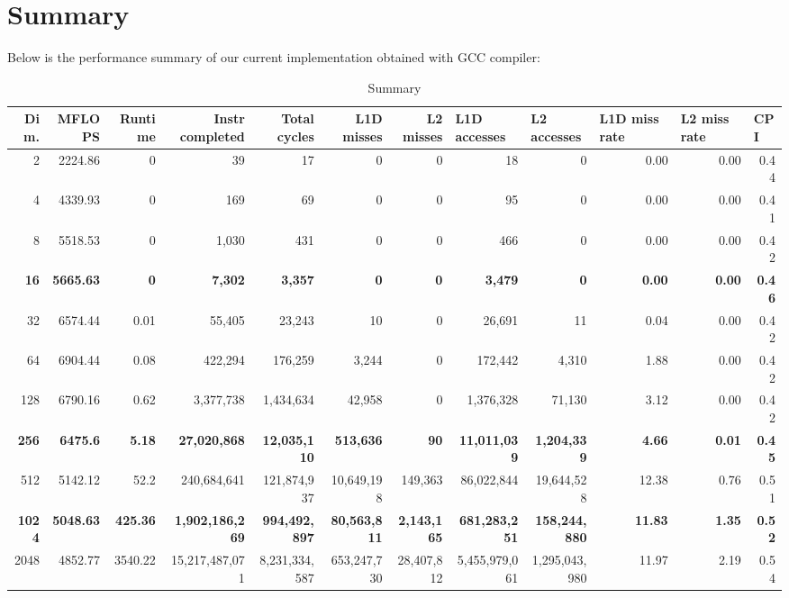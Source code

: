 \documentclass{article}
\begin{document}
\section{Summary}
Below is the performance summary of our current implementation obtained with GCC compiler:
\begin{table}[htbp]
\tiny
\caption{Summary}
\begin{tabular}{|r|r|r|r|r|r|r|r|r|r|r|r|}
\hline
Dim. &   MFLOPS &     Runtime & Instr completed & Total cycles & L1D misses & L2 misses & \multicolumn{1}{l|}{L1D accesses} & \multicolumn{1}{l|}{ L2 accesses} & \multicolumn{1}{l|}{L1D miss rate} & \multicolumn{1}{l|}{L2 miss rate} & \multicolumn{1}{l|}{CPI} \\ \hline
2 & 2224.86 & 0 & 39 & 17 & 0 & 0 & 18 & 0 & 0.00 & 0.00 & 0.44 \\ \hline
4 & 4339.93 & 0 & 169 & 69 & 0 & 0 & 95 & 0 & 0.00 & 0.00 & 0.41 \\ \hline
8 & 5518.53 & 0 & 1,030 & 431 & 0 & 0 & 466 & 0 & 0.00 & 0.00 & 0.42 \\ \hline
\textbf{16} & \textbf{5665.63} & \textbf{0} & \textbf{7,302} & \textbf{3,357} & \textbf{0} & \textbf{0} & \textbf{3,479} & \textbf{0} & \textbf{0.00} & \textbf{0.00} & \textbf{0.46} \\ \hline
32 & 6574.44 & 0.01 & 55,405 & 23,243 & 10 & 0 & 26,691 & 11 & 0.04 & 0.00 & 0.42 \\ \hline
64 & 6904.44 & 0.08 & 422,294 & 176,259 & 3,244 & 0 & 172,442 & 4,310 & 1.88 & 0.00 & 0.42 \\ \hline
128 & 6790.16 & 0.62 & 3,377,738 & 1,434,634 & 42,958 & 0 & 1,376,328 & 71,130 & 3.12 & 0.00 & 0.42 \\ \hline
\textbf{256} & \textbf{6475.6} & \textbf{5.18} & \textbf{27,020,868} & \textbf{12,035,110} & \textbf{513,636} & \textbf{90} & \textbf{11,011,039} & \textbf{1,204,339} & \textbf{4.66} & \textbf{0.01} & \textbf{0.45} \\ \hline
512 & 5142.12 & 52.2 & 240,684,641 & 121,874,937 & 10,649,198 & 149,363 & 86,022,844 & 19,644,528 & 12.38 & 0.76 & 0.51 \\ \hline
\textbf{1024} & \textbf{5048.63} & \textbf{425.36} & \textbf{1,902,186,269} & \textbf{994,492,897} & \textbf{80,563,811} & \textbf{2,143,165} & \textbf{681,283,251} & \textbf{158,244,880} & \textbf{11.83} & \textbf{1.35} & \textbf{0.52} \\ \hline
2048 & 4852.77 & 3540.22 & 15,217,487,071 & 8,231,334,587 & 653,247,730 & 28,407,812 & 5,455,979,061 & 1,295,043,980 & 11.97 & 2.19 & 0.54 \\ \hline
\end{tabular}
\label{}
\end{table}
\end{document}
